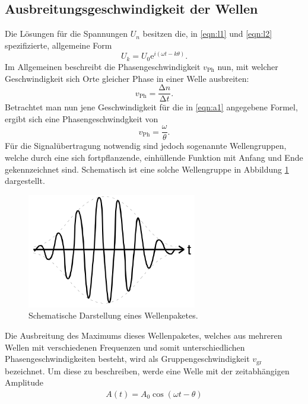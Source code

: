 \subsection{Ausbreitungsgeschwindigkeit der Wellen}
Die Lösungen für die Spannungen $U_n$ besitzen die, in \eqref{eqn:l1} und \eqref{eqn:l2} spezifizierte, allgemeine Form
\begin{equation}
  \label{eqn:a1}
  U_k = U_0 \mathrm{e}^{i(\omega t - k \theta)}.
\end{equation}
Im Allgemeinen beschreibt die Phasengeschwindigkeit $v_{\text{Ph}}$ nun, mit welcher Geschwindigkeit sich Orte gleicher Phase in einer Welle ausbreiten:
\begin{equation}
  v_{\text{Ph}} = \frac{\increment{n}}{\increment{t}}.
\end{equation}
Betrachtet man nun jene Geschwindigkeit für die in \eqref{eqn:a1} angegebene Formel, ergibt sich eine Phasengeschwindgkeit von
\begin{equation}
    \label{eqn:phase}
  v_{\text{Ph}} = \frac{\omega}{\theta}.
\end{equation}
Für die Signalübertragung notwendig sind jedoch sogenannte Wellengruppen, welche durch eine sich fortpflanzende, einhüllende Funktion mit Anfang und Ende gekennzeichnet sind.
Schematisch ist eine solche Wellengruppe in Abbildung \ref{tfig:3} dargestellt.
\begin{figure}[H]
  \centering
  \includegraphics[height=5cm]{wellenpaket.png}
  \caption{Schematische Darstellung eines Wellenpaketes. \cite{sample}}
  \label{tfig:3}
\end{figure}
Die Ausbreitung des Maximums dieses Wellenpaketes, welches aus mehreren Wellen mit verschiedenen Frequenzen und somit unterschiedlichen Phasengeschwindigkeiten besteht, wird als Gruppengeschwindigkeit $v_{\text{gr}}$ bezeichnet.
Um diese zu beschreiben, werde eine Welle mit der zeitabhängigen Amplitude
\begin{align*}
A(t) = A_0 \cos{(\omega t - \theta)}
\end{align*}
